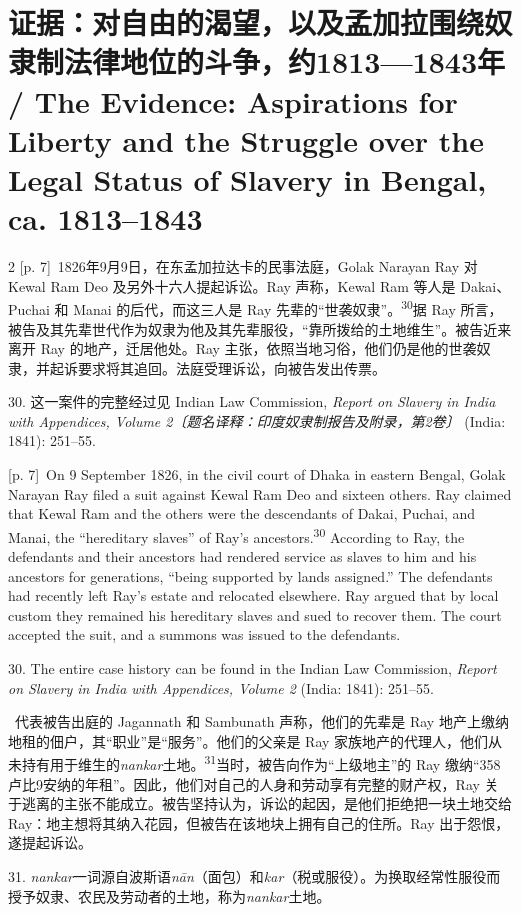 \documentclass[10pt,a4paper]{article}
\begin{document}
\section*{证据：对自由的渴望，以及孟加拉围绕奴隶制法律地位的斗争，约1813—1843年 / The Evidence: Aspirations for Liberty and the Struggle over the Legal Status of Slavery in Bengal, ca. 1813–1843}
\begin{paracol}{2}
{\scriptsize\color{gray} [p. 7]}\ 1826年9月9日，在东孟加拉达卡的民事法庭，Golak Narayan Ray 对 Kewal Ram Deo 及另外十六人提起诉讼。Ray 声称，Kewal Ram 等人是 Dakai、Puchai 和 Manai 的后代，而这三人是 Ray 先辈的“世袭奴隶”。\nobreak\textsuperscript{30}据 Ray 所言，被告及其先辈世代作为奴隶为他及其先辈服役，“靠所拨给的土地维生”。被告近来离开 Ray 的地产，迁居他处。Ray 主张，依照当地习俗，他们仍是他的世袭奴隶，并起诉要求将其追回。法庭受理诉讼，向被告发出传票。\par{\small 30. 这一案件的完整经过见 Indian Law Commission, \textit{Report on Slavery in India with Appendices, Volume 2〔题名译释：印度奴隶制报告及附录，第2卷〕} (India: 1841): 251–55.\par}
\switchcolumn
{\scriptsize\color{gray} [p. 7]}\ On 9 September 1826, in the civil court of Dhaka in eastern Bengal, Golak Narayan Ray filed a suit against Kewal Ram Deo and sixteen others. Ray claimed that Kewal Ram and the others were the descendants of Dakai, Puchai, and Manai, the “hereditary slaves” of Ray’s ancestors.\nobreak\textsuperscript{30} According to Ray, the defendants and their ancestors had rendered service as slaves to him and his ancestors for generations, “being supported by lands assigned.” The defendants had recently left Ray’s estate and relocated elsewhere. Ray argued that by local custom they remained his hereditary slaves and sued to recover them. The court accepted the suit, and a summons was issued to the defendants.\par{\small 30. The entire case history can be found in the Indian Law Commission, \textit{Report on Slavery in India with Appendices, Volume 2} (India: 1841): 251–55.\par}
\switchcolumn*
{\scriptsize\color{gray} [p. 7]}\ 代表被告出庭的 Jagannath 和 Sambunath 声称，他们的先辈是 Ray 地产上缴纳地租的佃户，其“职业”是“服务”。他们的父亲是 Ray 家族地产的代理人，他们从未持有用于维生的\textit{nankar}土\mbox{地。\textsuperscript{31}}当时，被告向作为“上级地主”的 Ray 缴纳“358卢比9安纳的年租”。因此，他们对自己的人身和劳动享有完整的财产权，Ray 关于逃离的主张不能成立。被告坚持认为，诉讼的起因，是他们拒绝把一块土地交给 Ray：地主想将其纳入花园，但被告在该地块上拥有自己的住所。Ray 出于怨恨，遂提起诉讼。\par{\small 31. \textit{nankar}一词源自波斯语\textit{nān}（面包）和\textit{kar}（税或服役）。为换取经常性服役而授予奴隶、农民及劳动者的土地，称为\textit{nankar}土地。\par}

\end{paracol}
\end{document}
